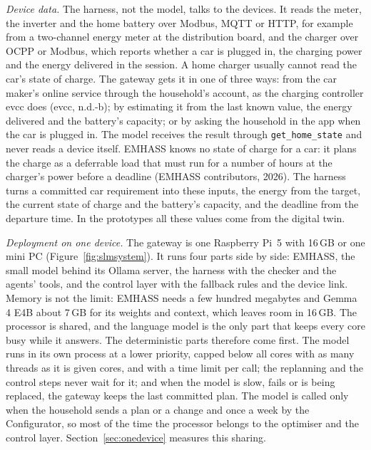 \documentclass[12pt,a4paper]{report}
\begin{document}
\textit{Device data.} The harness, not the model, talks to the devices.
It reads the meter, the inverter and the home battery over Modbus, MQTT
or HTTP, for example from a two-channel energy meter at the
distribution board, and the charger over OCPP or Modbus, which reports
whether a car is plugged in, the charging power and the energy
delivered in the session. A home charger usually cannot read the car's
state of charge. The gateway gets it in one of three ways: from the car
maker's online service through the household's account, as the
charging controller evcc does (evcc, n.d.-b); by estimating it
from the last known value, the energy delivered and the battery's
capacity; or by asking the household in the app when the car is
plugged in. The model receives the result through
\texttt{get\_home\_state} and never reads a device itself. EMHASS knows
no state of charge for a car: it plans the charge as a deferrable load
that must run for a number of hours at the charger's power before a
deadline (EMHASS contributors, 2026). The harness turns a committed car
requirement into these inputs, the energy from the target, the current
state of charge and the battery's capacity, and the deadline from the
departure time. In the prototypes all these values come from the
digital twin.

\textit{Deployment on one device.} The gateway is one Raspberry Pi~5
with 16\,GB or one mini PC (Figure~\ref{fig:slmsystem}). It runs four
parts side by side: EMHASS, the small model behind its Ollama server,
the harness with the checker and the agents' tools, and the control
layer with the fallback rules and the device link. Memory is not the
limit: EMHASS needs a few hundred megabytes and Gemma 4 E4B about
7\,GB for its weights and context, which leaves room in 16\,GB. The
processor is shared, and the language model is the only part that
keeps every core busy while it answers. The deterministic parts
therefore come first. The model runs in its own process at a lower
priority, capped below all cores with as many threads as it is given
cores, and with a time limit per call; the
replanning and the control steps never wait for it; and when the model
is slow, fails or is being replaced, the gateway keeps the last
committed plan. The model is called only when the household sends a
plan or a change and once a week by the Configurator, so most of the
time the processor belongs to the optimiser and the control layer.
Section~\ref{sec:onedevice} measures this sharing.

\end{document}
